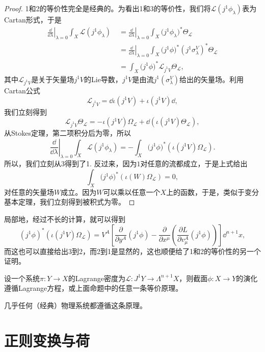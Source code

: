\begin{proof}
    1和2的等价性完全是经典的。为看出1和3的等价性，我们将$\mathcal L(j^1\phi_\lambda)$表为Cartan形式，于是
    \begin{align*}
        \left.\frac{\dd}{\dd \lambda}\right|_{\lambda=0}\int_X \mathcal L(j^1\phi_\lambda)\;&=\left.\frac{\dd}{\dd \lambda}\right|_{\lambda=0}\int_X \mathcal (j^1\phi_\lambda)^*\Theta_{\mathcal L}
        \\&=\left.\frac{\dd}{\dd \lambda}\right|_{\lambda=0}\int_X \mathcal (j^1\phi)^*(j^1\sigma^V_\lambda)^*\Theta_{\mathcal L}\\
        &=\int_X \mathcal (j^1\phi)^*\mathscr L_{j^1V}\Theta_{\mathcal L},
    \end{align*}
    其中$\mathscr L_{j^1V}$是关于矢量场$j^1V$的Lie导数，$j^1V$是由流$j^1(\sigma_\lambda^V)$给出的矢量场。利用Cartan公式
    \[
        \mathscr L_{j^1V}=\dd \iota(j^1V)+\iota(j^1V)\dd,
    \]
    我们立刻得到
    \[
        \mathscr L_{j^1V}\Theta_{\mathcal L}=-\iota(j^1V)\Omega_{\mathcal L}+\dd\left(\iota(j^1V) \Theta_{\mathcal L}\right),
    \]
    从Stokes定理，第二项积分后为零，所以
    \[
        \left.\frac{\dd}{\dd \lambda}\right|_{\lambda=0}\int_X \mathcal L(j^1\phi_\lambda)=-\int_X \mathcal (j^1\phi)^*(\iota(j^1V)\Omega_{\mathcal L}).
    \]
    所以，我们立刻从3得到了1. 反过来，因为$1$对任意的流都成立，于是上式给出
    \[
        \int_X \mathcal (j^1\phi)^*(\iota(W)\Omega_{\mathcal L})=0,
    \]
    对任意的矢量场$W$成立。因为$W$可以乘以任意一个$X$上的函数，于是，类似于变分基本定理，我们立刻得到被积式为零。
\end{proof}

局部地，经过不长的计算，就可以得到
\[
    (j^1\phi)^*(\iota(j^1V)\Omega_{\mathcal L})=V^A\left[\frac{\partial}{\partial y^A}(j^1\phi)-\frac{\partial}{\partial x^\mu}\left(\frac{\partial L}{\partial v^A_\mu}(j^1\phi)\right)\right]\dd^{n+1}x,
\]
而这也可以直接给出3到2，而2到1是显然的，这也顺便给了1和2的等价性的另一个证明。

\begin{para}[动力学原理]
    设一个系统$\pi:Y\to X$的Lagrange密度为$\mathcal{L}:J^1Y\to \Lambda^{n+1}X$，则截面$\phi:X\to Y$的演化遵循Lagrange方程，或上面命题中的任意一条等价原理。
\end{para}

几乎任何（经典）物理系统都遵循这条原理。

\section{正则变换与荷}

